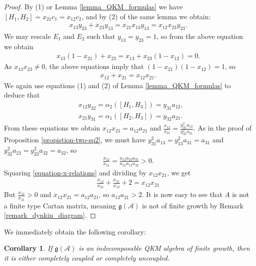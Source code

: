 \documentclass[12pt, a4paper, reqno]{amsart}
\newtheorem{corollary}{Corollary}
\theoremstyle{definition}
\theoremstyle{definition}
\theoremstyle{definition}
\numberwithin{theorem}{section}
\numberwithin{lemma}{section}
\numberwithin{remark}{section}
\numberwithin{definition}{section}
\numberwithin{corollary}{section}
\numberwithin{proposition}{section}
\numberwithin{example}{section}
\begin{document}
\begin{proof}
		By (1) or Lemma \ref{lemma_QKM_formulas} we have \([H_1,H_2] = x_{21}c_1 = x_{12}c_2\), and by (2) of the same lemma we obtain:
		\begin{align*}
			x_{13}y_{23}+x_{23}y_{13} = x_{21}x_{13}y_{13} = x_{12}x_{23}y_{23}.
		\end{align*}
		We may rescale \(E_1\) and \(E_2\) such that \(y_{13}=y_{23}= 1\), so from the above equation we obtain
		\begin{align*}
			x_{13}(1-x_{21})+x_{23} = x_{13} + x_{23}(1-x_{12}) = 0.
		\end{align*}
		As \(x_{13}x_{23} \neq 0\),  the above equations imply that \((1-x_{21})(1-x_{12}) = 1\), so 
		\begin{align}\label{equation-x-relations}
			x_{12}+x_{21} = x_{12}x_{21}.
		\end{align}
		We again use equations (1) and (2) of Lemma \ref{lemma_QKM_formulas} to deduce that
		\begin{align*}
			& x_{12}y_{32} = \alpha_2([H_1,H_3]) = y_{31}a_{12}, \\
			& x_{21}y_{31} = \alpha_1([H_2,H_3]) = y_{32}a_{21}.
		\end{align*}
		From these equations we obtain \(x_{12}x_{21} = a_{12}a_{21}\) and \(\frac{x_{12}}{x_{21}} = \frac{y_{31}^2a_{12}}{y_{32}^2a_{21}}\). As in the proof of Proposition \ref{propistion-two-sq2}, we must have \(y_{31}^2a_{13} = y_{13}^2a_{31} = a_{31}\) and \(y_{32}^2a_{23} = y_{23}^2a_{32} = a_{32}\), so
		\begin{align*}
			\frac{x_{12}}{x_{21}} = \frac{a_{12}a_{23}a_{31}}{a_{21}a_{13}a_{32}} > 0. 
		\end{align*}
		Squaring \eqref{equation-x-relations} and dividing by \(x_{12}x_{21}\), we get
		\begin{align*}
			\frac{x_{12}}{x_{21}} + \frac{x_{21}}{x_{12}} + 2 = x_{12}x_{21}
		\end{align*}
		But \(\frac{x_{12}}{x_{21}} > 0\) and \(x_{12}x_{21} = a_{12}a_{21}\), so \(a_{12}a_{21} > 2\). It is now easy to see that $A$ is not a finite type Cartan matrix, meaning \(\mathfrak{g}(\mathcal{A})\) is not of finite growth by Remark \ref{remark_dynkin_diagram}.	
	\end{proof}
	
	We immediately obtain the following corollary:
	
	\begin{corollary}
		If \(\mathfrak{g}(\mathcal{A})\) is an indecomposable QKM algebra of finite growth, then it is either completely coupled or completely uncoupled.
	\end{corollary}
	
\end{document}
